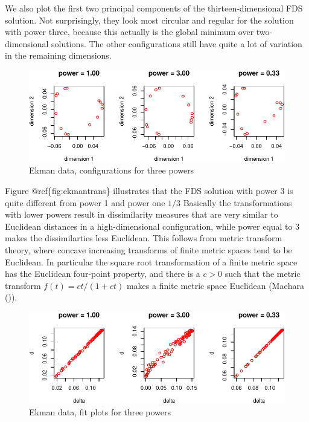 \documentclass[
  12pt,
  letterpaper,
  DIV=11,
  numbers=noendperiod]{scrreprt}
\theoremstyle{remark}
\begin{document}
We also plot the first two principal components of the
thirteen-dimensional FDS solution. Not surprisingly, they look most
circular and regular for the solution with power three, because this
actually is the global minimum over two-dimensional solutions. The other
configurations still have quite a lot of variation in the remaining
dimensions.

\begin{figure}[H]

{\centering \includegraphics{full_files/figure-pdf/ekmanconfs-1.pdf}

}

\caption{Ekman data, configurations for three powers}

\end{figure}%

Figure @ref\{fig:ekmantrans\} illustrates that the FDS solution with
power 3 is quite different from power 1 and power one \(1/3\) Basically
the transformations with lower powers result in dissimilarity measures
that are very similar to Euclidean distances in a high-dimensional
configuration, while power equal to 3 makes the dissimilarties less
Euclidean. This follows from metric transform theory, where concave
increasing transforms of finite metric spaces tend to be Euclidean. In
particular the square root transformation of a finite metric space has
the Euclidean four-point property, and there is a \(c>0\) such that the
metric transform \(f(t)=ct/(1+ct)\) makes a finite metric space
Euclidean (Maehara ()).

\begin{figure}[H]

{\centering \includegraphics{full_files/figure-pdf/ekmantrans-1.pdf}

}

\caption{Ekman data, fit plots for three powers}

\end{figure}%
\end{document}
